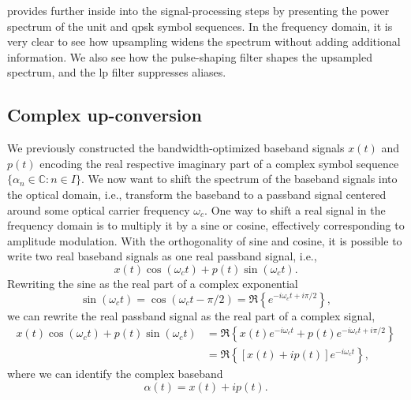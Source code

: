 provides further inside into the signal-processing steps by presenting the power spectrum of the unit and \gls{qpsk} symbol sequences.
In the frequency domain, it is very clear to see how upsampling widens the spectrum without adding additional information.
We also see how the pulse-shaping filter shapes the upsampled spectrum, and the \gls{lp} filter suppresses aliases.

\FloatBarrier
\subsection{Complex up-conversion}

We previously constructed the bandwidth-optimized baseband signals $x(t)$ and $p(t)$ encoding the real respective imaginary part of a complex symbol sequence $\{\alpha_n\in\mathbb{C}\colon n\in I\}$.
We now want to shift the spectrum of the baseband signals into the optical domain, i.e., transform the baseband to a passband signal centered around some optical carrier frequency $\omega_c$.
One way to shift a real signal in the frequency domain is to multiply it by a sine or cosine, effectively corresponding to amplitude modulation.
With the orthogonality of sine and cosine, it is possible to write two real baseband signals as one real passband signal, i.e.,
\begin{equation}
	x(t)
	\cos(\omega_ct)
	+
	p(t)
	\sin(\omega_ct)
	.
\end{equation}
Rewriting the sine as the real part of a complex exponential
\begin{equation}
	\sin(\omega_ct)
	=
	\cos(\omega_c t-\pi/2)
	=
	\Re\left\{e^{-i\omega_c t+i\pi/2}\right\}
	,
\end{equation}
we can rewrite the real passband signal as the real part of a complex signal,
\begin{equation}
	\begin{split}
		x(t)
		\cos(\omega_ct)
		+
		p(t)
		\sin(\omega_ct)
		&=
		\Re\left\{
			x(t)
			e^{-i\omega_ct}
			+
			p(t)
			e^{-i\omega_ct+i\pi/2}
		\right\}
		\\
		&=
		\Re\left\{
			\left[
				x(t)
				+
				ip(t)
			\right]
			e^{-i\omega_ct}
		\right\}
		,
	\end{split}
	\label{eq:real_complex_passband}
\end{equation}
where we can identify the complex baseband
\begin{equation}
	\alpha(t)
	=
	x(t)
	+
	ip(t)
	.
\end{equation}
